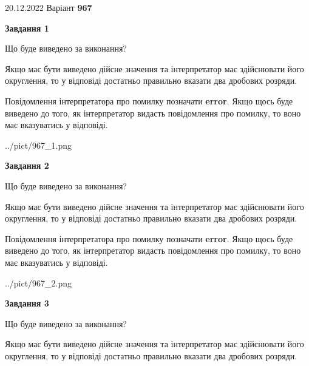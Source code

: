 \documentclass[12pt, ukrainian]{article}
\begin{document}
{20.12.2022 Варіант \No \textbf { 967 }\par}
{
\begin {Large}

{\begin {center}\textbf{Завдання 1}\end {center}}\par
Що буде виведено за виконання? \par

Якщо має бути виведено дійсне значення та інтерпретатор має здійснювати його округлення, 
то у відповіді достатньо правильно вказати два дробових розряди.

Повідомлення інтерпретатора про помилку позначати \textbf{error}.
Якщо щось буде виведено до того, як інтерпретатор видасть повідомлення про помилку, 
то воно має вказуватись у відповіді. \par

\begin{center}
	{../pict/967_1.png}
\end{center}
\newpage

{\begin {center}\textbf{Завдання 2}\end {center}}\par
Що буде виведено за виконання? \par

Якщо має бути виведено дійсне значення та інтерпретатор має здійснювати його округлення, 
то у відповіді достатньо правильно вказати два дробових розряди.

Повідомлення інтерпретатора про помилку позначати \textbf{error}.
Якщо щось буде виведено до того, як інтерпретатор видасть повідомлення про помилку, 
то воно має вказуватись у відповіді. \par

\begin{center}
	{../pict/967_2.png}
\end{center}
\newpage

{\begin {center}\textbf{Завдання 3}\end {center}}\par
Що буде виведено за виконання? \par

Якщо має бути виведено дійсне значення та інтерпретатор має здійснювати його округлення, 
то у відповіді достатньо правильно вказати два дробових розряди.


\end{Large}}
\end{document}
